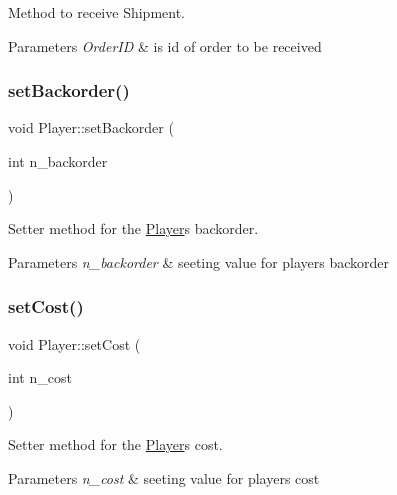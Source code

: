 Method to receive Shipment. 


\begin{DoxyParams}{Parameters}
{\em Order\+ID} & is id of order to be received \\
\hline
\end{DoxyParams}
\mbox{\label{class_player_a55cf59cc96744fee031167b7736e5d35}} 
\subsubsection{\texorpdfstring{set\+Backorder()}{setBackorder()}}
{\footnotesize\ttfamily void Player\+::set\+Backorder (\begin{DoxyParamCaption}\item[{int}]{n\+\_\+backorder }\end{DoxyParamCaption})}



Setter method for the \hyperlink{class_player}{Player}\textquotesingle{}s backorder. 


\begin{DoxyParams}{Parameters}
{\em n\+\_\+backorder} & seeting value for player\textquotesingle{}s backorder \\
\hline
\end{DoxyParams}
\mbox{\label{class_player_adae26798d67d12ad53bd3d9ba2e8b0fc}} 
\subsubsection{\texorpdfstring{set\+Cost()}{setCost()}}
{\footnotesize\ttfamily void Player\+::set\+Cost (\begin{DoxyParamCaption}\item[{int}]{n\+\_\+cost }\end{DoxyParamCaption})}



Setter method for the \hyperlink{class_player}{Player}\textquotesingle{}s cost. 


\begin{DoxyParams}{Parameters}
{\em n\+\_\+cost} & seeting value for player\textquotesingle{}s cost \\
\hline
\end{DoxyParams}
\mbox{\label{class_player_aba795131e99318dfc9d4fef7de189aac}} 
